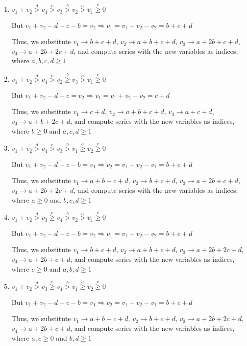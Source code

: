 \documentclass{article}
\begin{document}
\begin{enumerate}
\item 
$v_1+v_2\overset{d}{>}v_4\overset{c}{>}v_3\overset{b}{>}{v_2}\overset{a}{>}v_1\overset{e}{\geq}{0}$

But $v_1+v_2-d-c-b=v_2\Rightarrow{v_1=v_1+v_2-v_2=b+c+d}$

Thus, we substitute 
$v_1\rightarrow{b+c+d}$, $v_2\rightarrow{a+b+c+d}$, $v_3\rightarrow{a+2b+c+d}$, $v_4\rightarrow{a+2b+2c+d}$, and compute series with the new variables as indices, where $a,b,c,d\geq{1}$

\item 
$v_1+v_2\overset{d}{>}v_4\overset{c}{>}v_2\overset{b}{\geq}{v_3}\overset{a}{>}v_1\overset{e}{\geq}{0}$

But $v_1+v_2-d-c=v_2\Rightarrow{v_1=v_1+v_2-v_2=c+d}$

Thus, we substitute 
$v_1\rightarrow{c+d}$, $v_2\rightarrow{a+b+c+d}$, $v_3\rightarrow{a+c+d}$, $v_4\rightarrow{a+b+2c+d}$, and compute series with the new variables as indices, where $b\geq{0}$ and $a,c,d\geq{1}$

\item 
$v_1+v_2\overset{d}{>}v_4\overset{c}{>}v_3\overset{b}{>}{v_1}\overset{a}{\geq}v_2\overset{e}{\geq}{0}$

But $v_1+v_2-d-c-b=v_1\Rightarrow{v_2=v_1+v_2-v_1=b+c+d}$

Thus, we substitute 
$v_1\rightarrow{a+b+c+d}$, $v_2\rightarrow{b+c+d}$, $v_3\rightarrow{a+2b+c+d}$, $v_4\rightarrow{a+2b+2c+d}$, and compute series with the new variables as indices, where $a\geq{0}$ and $b,c,d\geq{1}$

\item 
$v_1+v_2\overset{d}{>}v_3\overset{c}{\geq}v_4\overset{b}{>}{v_2}\overset{a}{>}v_1\overset{e}{\geq}{0}$

But $v_1+v_2-d-c-b=v_2\Rightarrow{v_1=v_1+v_2-v_2=b+c+d}$

Thus, we substitute 
$v_1\rightarrow{b+c+d}$, $v_2\rightarrow{a+b+c+d}$, $v_3\rightarrow{a+2b+2c+d}$, $v_4\rightarrow{a+2b+c+d}$, and compute series with the new variables as indices, where $c\geq{0}$ and $a,b,d\geq{1}$
\item 
$v_1+v_2\overset{d}{>}v_3\overset{c}{\geq}v_4\overset{b}{>}{v_1}\overset{a}{\geq}v_2\overset{e}{\geq}{0}$

But $v_1+v_2-d-c-b=v_1\Rightarrow{v_2=v_1+v_2-v_1=b+c+d}$

Thus, we substitute 
$v_1\rightarrow{a+b+c+d}$, $v_2\rightarrow{b+c+d}$, $v_3\rightarrow{a+2b+2c+d}$, $v_4\rightarrow{a+2b+c+d}$, and compute series with the new variables as indices, where $a,c\geq{0}$ and $b,d\geq{1}$
\end{enumerate}
\end{document}
